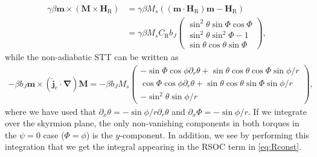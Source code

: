 \begin{align}
    \nonumber \gamma\beta\mathbold{m}\times\left(\mathbold{M}\times\mathbold{H}_{\text{R}}\right) &= \gamma\beta M_s\left(\left(\mathbold{m}\cdot\mathbold{H}_{\text{R}}\right)\mathbold{m}-\mathbold{H}_{\text{R}}\right) \\
    &=     
    \gamma\beta M_s C_{\text{R}} b_J
    \begin{pmatrix}
     \sin^2\theta\sin\Phi\cos\Phi \\
     \sin^2\theta\sin^2\Phi-1 \\
     \sin\theta\cos\theta\sin\Phi
    \end{pmatrix},
\end{align}
while the non-adiabatic STT can be written as 
\begin{align}
    -\beta b_J\mathbold{m}\times\left(\mathbold{\hat{j}}_e\cdot\mathbold{\nabla}\right)\mathbold{M} =     
    -\beta b_J M_s
    \begin{pmatrix}
     -\sin\Phi\cos\phi\partial_r\theta + \sin\theta\cos\theta\cos\Phi\sin\phi/r \\
     \cos\Phi\cos\phi\partial_r\theta + \sin\theta\cos\theta\sin\Phi\sin\phi/r \\
     -\sin^2\theta\sin\phi/r
    \end{pmatrix},
\end{align}
where we have used that $\partial_x\theta = -\sin\phi/r\partial_r\theta$ and $\partial_x\Phi = -\sin\phi/r$. If we integrate over the skyrmion plane, the only non-vanishing components in both torques in the $\psi=0$ case ($\Phi=\phi$) is the $y$-component. In addition, we see by performing this integration that we get the integral appearing in the RSOC term in \eqref{eq:Rconst}.

